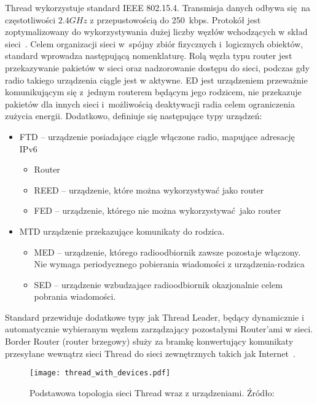 Thread wykorzystuje standard IEEE 802.15.4. Transmisja danych odbywa się na częstotliwości $2.4GHz$ z przepustowością
do 250~kbps. Protokół jest zoptymalizowany do wykorzystywania dużej liczby węzłów wchodzących w skład sieci~\cite{silicon_laboratories_ug10311_2022}.
Celem organizacji sieci w~spójny zbiór fizycznych i~logicznych obiektów, standard wprowadza następującą nomenklaturę.
Rolą węzła typu router jest przekazywanie pakietów w sieci oraz nadzorowanie dostępu do sieci, podczas gdy radio
takiego urządzenia ciągle jest w aktywne. \gls{ED} jest urządzeniem przeważnie komunikującym się z~jednym
routerem będącym jego rodzicem, nie przekazuje pakietów dla innych sieci i~możliwością deaktywacji radia
celem ograniczenia zużycia energii. Dodatkowo, definiuje się następujące typy urządzeń:
\begin{itemize}
\item \gls{FTD} -- urządzenie posiadające ciągle włączone radio, mapujące adresację IPv6
	\begin{itemize}
	\item Router
	\item \gls{REED} -- urządzenie, które można wykorzystywać jako router
	\item \gls{FED} -- urządzenie, którego nie można wykorzystywać jako router
	\end{itemize}
\item \gls{MTD} urządzenie przekazujące komunikaty do rodzica.
	\begin{itemize}
	\item \gls{MED} -- urządzenie, którego radioodbiornik zawsze pozostaje włączony. Nie wymaga periodycznego
	pobierania wiadomości z urządzenia-rodzica
	\item \gls{SED} -- urządzenie wzbudzające radioodbiornik okazjonalnie celem pobrania wiadomości.
	\end{itemize}
\end{itemize}
Standard przewiduje dodatkowe typy jak Thread Leader, będący dynamicznie i automatycznie wybieranym węzłem
zarządzający pozostałymi Router'ami w sieci. Border Router (router brzegowy) służy za bramkę
konwertujący komunikaty przesyłane wewnątrz sieci Thread do sieci zewnętrznych takich jak Internet~\cite{noauthor_node_2022}.

\begin{figure}[!ht]
	\centering \texttt{[image: thread\_with\_devices.pdf]}
	\caption{Podstawowa topologia sieci Thread wraz z urządzeniami. Źródło:~\cite{thread_group_thread_2020}}
	\label{rys:thread_topology_devices_threadgroup}
\end{figure}

